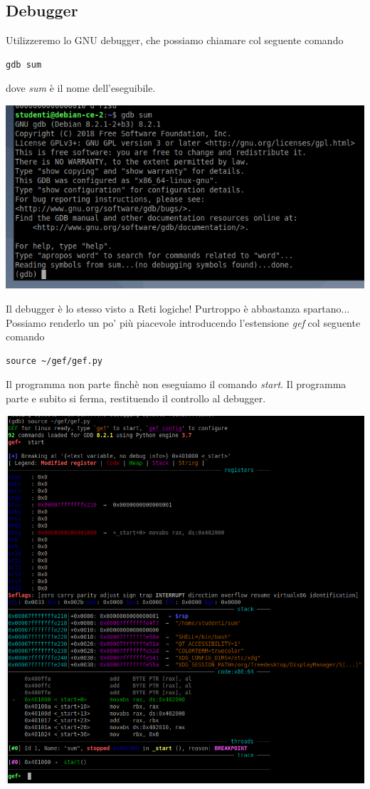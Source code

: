 \documentclass[11pt]{report}
\theoremstyle{definition}
\begin{document}
\subsection{Debugger} Utilizzeremo lo GNU debugger, che possiamo chiamare col seguente comando
\begin{verbatim}
gdb sum
\end{verbatim}
dove \emph{sum} è il nome dell'eseguibile.
\begin{center}
	\includegraphics{img/143.PNG}
\end{center}
Il debugger è lo stesso visto a Reti logiche! Purtroppo è abbastanza spartano... Possiamo renderlo un po' più piacevole introducendo l'estensione \emph{gef} col seguente comando
\begin{verbatim}
source ~/gef/gef.py
\end{verbatim}
Il programma non parte finchè non eseguiamo il comando \emph{start}. Il programma parte e subito si ferma, restituendo il controllo al debugger.
\begin{center}
	\includegraphics[scale=.9]{img/144.PNG}
\end{center}
\end{document}

